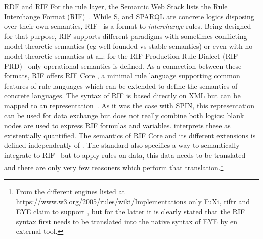 \begin{paragraph}{RDF and RIF}
For the rule layer, the Semantic Web Stack lists the Rule Interchange Format (RIF)~\cite{rif}.
While \rdf{}S, \owl and SPARQL are concrete logics disposing 
over their own semantics, RIF~\cite{rif} is a format to \emph{interchange} rules. 
Being designed for that purpose, RIF supports different paradigms with sometimes 
conflicting model-theoretic semantics (eg well-founded vs stable semantics) or even with no model-theoretic semantics at all: 
for the RIF Production Rule Dialect (RIF-PRD)~\cite{rifprd} only operational semantics is defined. 
As a connection between these formats, RIF offers RIF Core \cite{rifcore}, a minimal rule language supporting common features of rule languages which can be 
extended to define the semantics of concrete languages.
The syntax of RIF is based directly on XML but can be mapped to an \rdf representation~\cite{rifinrdf}. 
As it was the case with SPIN, this representation can be used for data exchange but does not really combine both logics: 
blank nodes are used to express RIF formulas and variables. \rdf interprets these as existentially quantified.
The semantics of 
RIF Core and its different extensions is defined independently of \rdf. 
The standard also specifies a way to semantically integrate \rdf to RIF~\cite{rifrdf} but to apply rules on \rdf data, this data needs to be translated
and there are only very few reasoners which perform that translation.\footnote{From the different engines listed at \url{https://www.w3.org/2005/rules/wiki/Implementations}
only FuXi, riftr and EYE 
claim to support \rdf, but for the latter it is clearly stated that the RIF syntax first needs to be translated into the native syntax of EYE by en external tool. }
\end{paragraph}
